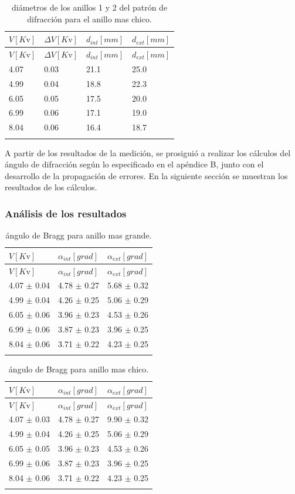 \documentclass[]{article}
\begin{document}
\begin{longtable}[]{@{}llll@{}}
\toprule
\(V[K\mathrm{v}]\) & \(\Delta V[K\mathrm{v}]\) & \(d_{int}[mm]\) &
\(d_{ext}[mm]\)\tabularnewline
\midrule
\endfirsthead
\toprule
\(V[K\mathrm{v}]\) & \(\Delta V[K\mathrm{v}]\) & \(d_{int}[mm]\) &
\(d_{ext}[mm]\)\tabularnewline
\midrule
\endhead
4.07 & 0.03 & 21.1 & 25.0\tabularnewline
4.99 & 0.04 & 18.8 & 22.3\tabularnewline
6.05 & 0.05 & 17.5 & 20.0\tabularnewline
6.99 & 0.06 & 17.1 & 19.0\tabularnewline
8.04 & 0.06 & 16.4 & 18.7\tabularnewline
\bottomrule
\caption{diámetros de los anillos 1 y 2 del patrón de difracción para el
anillo mas chico.}\tabularnewline
\end{longtable}

A partir de los resultados de la medición, se prosiguió a realizar los
cálculos del ángulo de difracción según lo especificado en el apéndice
B, junto con el desarrollo de la propagación de errores. En la siguiente
sección se muestran los resultados de los cálculos.

\hypertarget{anuxe1lisis-de-los-resultados}{%
\subsubsection{Análisis de los
resultados}\label{anuxe1lisis-de-los-resultados}}

\begin{longtable}[]{@{}lll@{}}
\toprule
\(V[K\mathrm{v}]\) & \(\alpha_{int} [grad]\) &
\(\alpha_{ext} [grad]\)\tabularnewline
\midrule
\endfirsthead
\toprule
\(V[K\mathrm{v}]\) & \(\alpha_{int} [grad]\) &
\(\alpha_{ext} [grad]\)\tabularnewline
\midrule
\endhead
4.07 \(\pm\) 0.04 & 4.78 \(\pm\) 0.27 & 5.68 \(\pm\) 0.32\tabularnewline
4.99 \(\pm\) 0.04 & 4.26 \(\pm\) 0.25 & 5.06 \(\pm\) 0.29\tabularnewline
6.05 \(\pm\) 0.06 & 3.96 \(\pm\) 0.23 & 4.53 \(\pm\) 0.26\tabularnewline
6.99 \(\pm\) 0.06 & 3.87 \(\pm\) 0.23 & 3.96 \(\pm\) 0.25\tabularnewline
8.04 \(\pm\) 0.06 & 3.71 \(\pm\) 0.22 & 4.23 \(\pm\) 0.25\tabularnewline
\bottomrule
\caption{ángulo de Bragg para anillo mas grande.}\tabularnewline
\end{longtable}

\begin{longtable}[]{@{}lll@{}}
\toprule
\(V[K\mathrm{v}]\) & \(\alpha_{int} [grad]\) &
\(\alpha_{ext} [grad]\)\tabularnewline
\midrule
\endfirsthead
\toprule
\(V[K\mathrm{v}]\) & \(\alpha_{int} [grad]\) &
\(\alpha_{ext} [grad]\)\tabularnewline
\midrule
\endhead
4.07 \(\pm\) 0.03 & 4.78 \(\pm\) 0.27 & 9.90 \(\pm\) 0.32\tabularnewline
4.99 \(\pm\) 0.04 & 4.26 \(\pm\) 0.25 & 5.06 \(\pm\) 0.29\tabularnewline
6.05 \(\pm\) 0.05 & 3.96 \(\pm\) 0.23 & 4.53 \(\pm\) 0.26\tabularnewline
6.99 \(\pm\) 0.06 & 3.87 \(\pm\) 0.23 & 3.96 \(\pm\) 0.25\tabularnewline
8.04 \(\pm\) 0.06 & 3.71 \(\pm\) 0.22 & 4.23 \(\pm\) 0.25\tabularnewline
\bottomrule
\caption{ángulo de Bragg para anillo mas chico.}\tabularnewline
\end{longtable}
\end{document}
